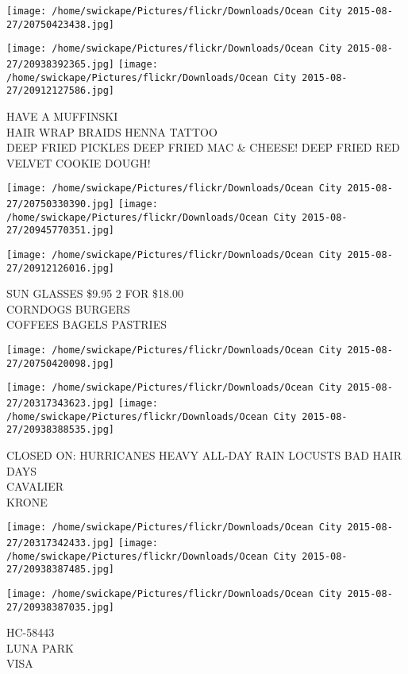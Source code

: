\documentclass[10pt,letterpaper]{article}
\begin{document}
\texttt{[image: /home/swickape/Pictures/flickr/Downloads/Ocean City 2015-08-27/20750423438.jpg]}

\vspace{0.25in}
\texttt{[image: /home/swickape/Pictures/flickr/Downloads/Ocean City 2015-08-27/20938392365.jpg]}
\texttt{[image: /home/swickape/Pictures/flickr/Downloads/Ocean City 2015-08-27/20912127586.jpg]}

HAVE A MUFFINSKI\\
HAIR WRAP BRAIDS HENNA TATTOO\\
DEEP FRIED PICKLES  DEEP FRIED MAC \& CHEESE!  DEEP FRIED RED VELVET COOKIE DOUGH!
\pagebreak

\texttt{[image: /home/swickape/Pictures/flickr/Downloads/Ocean City 2015-08-27/20750330390.jpg]}
\texttt{[image: /home/swickape/Pictures/flickr/Downloads/Ocean City 2015-08-27/20945770351.jpg]}

\texttt{[image: /home/swickape/Pictures/flickr/Downloads/Ocean City 2015-08-27/20912126016.jpg]}

SUN GLASSES \$9.95 2 FOR \$18.00\\
CORNDOGS BURGERS\\
COFFEES BAGELS PASTRIES
\pagebreak

\texttt{[image: /home/swickape/Pictures/flickr/Downloads/Ocean City 2015-08-27/20750420098.jpg]}

\vspace{0.25in}
\texttt{[image: /home/swickape/Pictures/flickr/Downloads/Ocean City 2015-08-27/20317343623.jpg]}
\texttt{[image: /home/swickape/Pictures/flickr/Downloads/Ocean City 2015-08-27/20938388535.jpg]}

CLOSED ON: HURRICANES HEAVY ALL{-}DAY RAIN LOCUSTS BAD HAIR DAYS\\
CAVALIER\\
KRONE
\pagebreak

\texttt{[image: /home/swickape/Pictures/flickr/Downloads/Ocean City 2015-08-27/20317342433.jpg]}
\texttt{[image: /home/swickape/Pictures/flickr/Downloads/Ocean City 2015-08-27/20938387485.jpg]}

\texttt{[image: /home/swickape/Pictures/flickr/Downloads/Ocean City 2015-08-27/20938387035.jpg]}

HC{-}58443\\
LUNA PARK\\
VISA
\pagebreak
\end{document}
